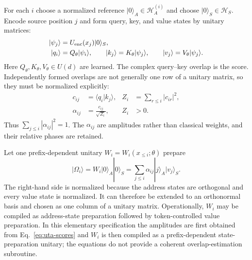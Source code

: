 \documentclass[
  aps,
  reprint,
  superscriptaddress,
  floatfix,
  nofootinbib,
  longbibliography
]{revtex4-2}
\begin{document}
For each $i$ choose a normalized reference $|0\rangle_A\in\mathcal H_A^{(i)}$
and choose $|0\rangle_S\in\mathcal H_S$.  Encode source position $j$ and form
query, key, and value states by unitary matrices:
\begin{equation}
\begin{aligned}
 |\psi_j\rangle&=U_{\rm enc}(x_j)|0\rangle_S,\\
 |q_i\rangle&=Q_\theta|\psi_i\rangle,\qquad
 |k_j\rangle=K_\theta|\psi_j\rangle,\qquad
 |v_j\rangle=V_\theta|\psi_j\rangle .
\end{aligned}
\label{eq:uta-encoding}
\end{equation}
Here $Q_\theta,K_\theta,V_\theta\in U(d)$ are learned.  The complex
query--key overlap is the score.  Independently formed overlaps are not
generally one row of a unitary matrix, so they must be normalized explicitly:
\begin{equation}
\begin{aligned}
 c_{ij}&=\langle q_i|k_j\rangle,
 &Z_i&=\sum_{r\leq i}|c_{ir}|^2,\\
 \alpha_{ij}&=\frac{c_{ij}}{\sqrt{Z_i}},
 &Z_i&>0 .
\end{aligned}
\label{eq:uta-scores}
\end{equation}
Thus $\sum_{j\leq i}|\alpha_{ij}|^2=1$.  The $\alpha_{ij}$ are amplitudes
rather than classical weights, and their relative phases are retained.

Let one prefix-dependent unitary $W_i=W_i(x_{\leq i};\theta)$ prepare
\begin{equation}
 |\Omega_i\rangle
 =W_i|0\rangle_A|0\rangle_S
 =\sum_{j\leq i}\alpha_{ij}|j\rangle_A|v_j\rangle_S .
\label{eq:uta-unitary}
\end{equation}
The right-hand side is normalized because the address states are orthogonal
and every value state is normalized.  It can therefore be extended to an
orthonormal basis and chosen as one column of a unitary matrix.
Operationally, $W_i$ may be compiled as address-state preparation followed by
token-controlled value preparation.  In this elementary specification the
amplitudes are first obtained from Eq.~\eqref{eq:uta-scores} and $W_i$ is then
compiled as a prefix-dependent state-preparation unitary; the equations do not
provide a coherent overlap-estimation subroutine.
\end{document}
